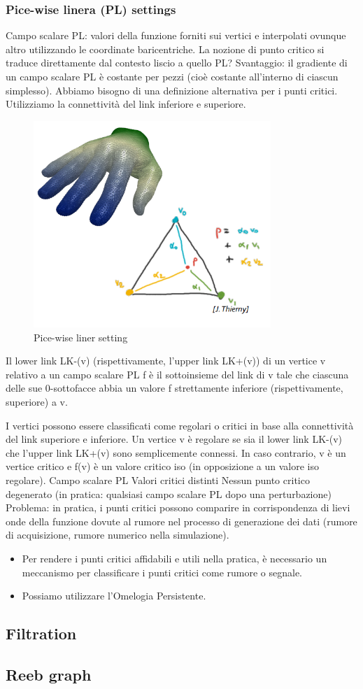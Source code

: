 \subsubsection{Pice-wise linera (PL) settings}
Campo scalare PL: valori della funzione forniti sui vertici e interpolati ovunque altro utilizzando le coordinate baricentriche.
La nozione di punto critico si traduce direttamente dal contesto liscio a quello PL?
Svantaggio: il gradiente di un campo scalare PL è costante per pezzi (cioè costante all'interno di ciascun simplesso). Abbiamo bisogno di una definizione alternativa per i punti critici. Utilizziamo la connettività del link inferiore e superiore.
\begin{figure}[H]
    \centering
    \includegraphics[width=0.8\textwidth]{images/Picewise.png} 
    \caption{Pice-wise liner setting}
    \label{fig:immagine}
\end{figure}
Il lower link LK-(v) (rispettivamente, l'upper link LK+(v)) di un vertice v relativo a un campo scalare PL f è il sottoinsieme del link di v tale che ciascuna delle sue 0-sottofacce abbia un valore f strettamente inferiore (rispettivamente, superiore) a v.

I vertici possono essere classificati come regolari o critici in base alla connettività del link superiore e inferiore. Un vertice v è regolare se sia il lower link LK-(v) che l'upper link LK+(v) sono semplicemente connessi. In caso contrario, v è un vertice critico e f(v) è un valore critico iso (in opposizione a un valore iso regolare).
Campo scalare PL
Valori critici distinti
Nessun punto critico degenerato
(in pratica: qualsiasi campo scalare PL dopo una perturbazione)
Problema: in pratica, i punti critici possono comparire in corrispondenza di lievi onde della funzione dovute al rumore nel processo di generazione dei dati (rumore di acquisizione, rumore numerico nella simulazione).
\begin{itemize}
    \item Per rendere i punti critici affidabili e utili nella pratica, è necessario un meccanismo per classificare i punti critici come rumore o segnale.
    \item Possiamo utilizzare l'Omelogia Persistente.
\end{itemize}

\subsection{Filtration}
\subsection{Reeb graph}